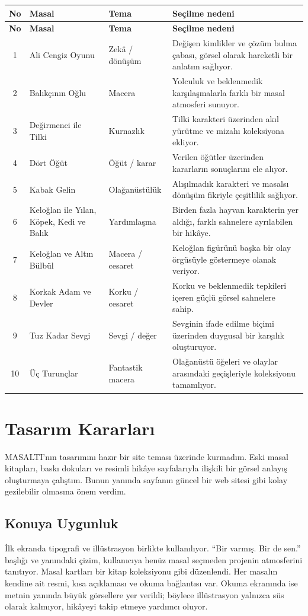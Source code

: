\documentclass[12pt,a4paper]{article}
\begin{document}
{\small
\begin{longtable}{@{}cp{4.4cm}p{2.5cm}p{5.5cm}@{}}
\toprule
\textbf{No} & \textbf{Masal} & \textbf{Tema} & \textbf{Seçilme nedeni} \\
\midrule
\endfirsthead
\toprule \textbf{No} & \textbf{Masal} & \textbf{Tema} & \textbf{Seçilme nedeni} \\ \midrule
\endhead
1 & Ali Cengiz Oyunu & Zekâ / dönüşüm & Değişen kimlikler ve çözüm bulma çabası, görsel olarak hareketli bir anlatım sağlıyor. \\
2 & Balıkçının Oğlu & Macera & Yolculuk ve beklenmedik karşılaşmalarla farklı bir masal atmosferi sunuyor. \\
3 & Değirmenci ile Tilki & Kurnazlık & Tilki karakteri üzerinden akıl yürütme ve mizahı koleksiyona ekliyor. \\
4 & Dört Öğüt & Öğüt / karar & Verilen öğütler üzerinden kararların sonuçlarını ele alıyor. \\
5 & Kabak Gelin & Olağanüstülük & Alışılmadık karakteri ve masalsı dönüşüm fikriyle çeşitlilik sağlıyor. \\
6 & Keloğlan ile Yılan, Köpek, Kedi ve Balık & Yardımlaşma & Birden fazla hayvan karakterin yer aldığı, farklı sahnelere ayrılabilen bir hikâye. \\
7 & Keloğlan ve Altın Bülbül & Macera / cesaret & Keloğlan figürünü başka bir olay örgüsüyle göstermeye olanak veriyor. \\
8 & Korkak Adam ve Devler & Korku / cesaret & Korku ve beklenmedik tepkileri içeren güçlü görsel sahnelere sahip. \\
9 & Tuz Kadar Sevgi & Sevgi / değer & Sevginin ifade edilme biçimi üzerinden duygusal bir karşılık oluşturuyor. \\
10 & Üç Turunçlar & Fantastik macera & Olağanüstü öğeleri ve olaylar arasındaki geçişleriyle koleksiyonu tamamlıyor. \\
\bottomrule
\end{longtable}}

\section{Tasarım Kararları}
MASALTI'nın tasarımını hazır bir site teması üzerinde kurmadım. Eski masal kitapları, baskı dokuları ve resimli hikâye sayfalarıyla ilişkili bir görsel anlayış oluşturmaya çalıştım. Bunun yanında sayfanın güncel bir web sitesi gibi kolay gezilebilir olmasına önem verdim.

\subsection{Konuya Uygunluk}
İlk ekranda tipografi ve illüstrasyon birlikte kullanılıyor. ``Bir varmış. Bir de sen.'' başlığı ve yanındaki çizim, kullanıcıya henüz masal seçmeden projenin atmosferini tanıtıyor. Masal kartları bir kitap koleksiyonu gibi düzenlendi. Her masalın kendine ait resmi, kısa açıklaması ve okuma bağlantısı var. Okuma ekranında ise metnin yanında büyük görsellere yer verildi; böylece illüstrasyon yalnızca süs olarak kalmıyor, hikâyeyi takip etmeye yardımcı oluyor.
\end{document}
